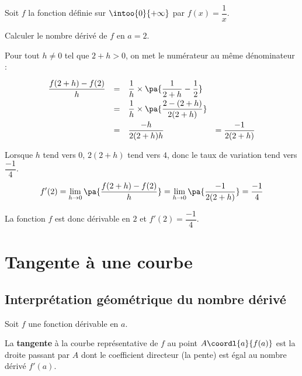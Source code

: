 \begin{methode}
	Soit $f$ la fonction définie sur $\intoo{0}{+\infty}$ par $f(x) = \dfrac{1}{x}$.

	Calculer le nombre dérivé de $f$ en $a = 2$.

	\begin{correction}
		Pour tout $h \neq 0$ tel que $2 + h > 0$, on met le numérateur au même dénominateur :
		\[
			\def\arraystretch{2}
			\begin{array}{rcll}
				\dfrac{f(2 + h) - f(2)}{h} & = & \dfrac{1}{h}\times\pa{\dfrac{1}{2 + h} - \dfrac{1}{2}} &                        \\
				                           & = & \dfrac{1}{h}\times\pa{\dfrac{2 - (2 + h)}{2(2 + h)}}   &                        \\
				                           & = & \dfrac{-h}{2(2 + h)h}                                  & = \dfrac{-1}{2(2 + h)}
			\end{array}
		\]

		Lorsque $h$ tend vers $0$, $2(2 + h)$ tend vers $4$, donc le taux de variation tend vers $\dfrac{-1}{4}$.
		\[
			f'(2)=\lim\limits_{h\to 0}\pa{\dfrac{f(2+h)-f(2)}{h}}=\lim\limits_{h\to 0}\pa{\dfrac{-1}{2(2 + h)}}=\dfrac{-1}{4}
		\]

		La fonction $f$ est donc dérivable en $2$ et $f'(2) = \dfrac{-1}{4}$.
	\end{correction}
\end{methode}

\section{Tangente à une courbe}

\subsection{Interprétation géométrique du nombre dérivé}

\begin{defin}
	Soit $f$ une fonction dérivable en $a$.

	La \textbf{tangente} à la courbe représentative de $f$ au point $A\coordl{a}{f(a)}$ est la droite passant par $A$ dont le coefficient directeur (la pente) est égal au nombre dérivé $f'(a)$.
\end{defin}

